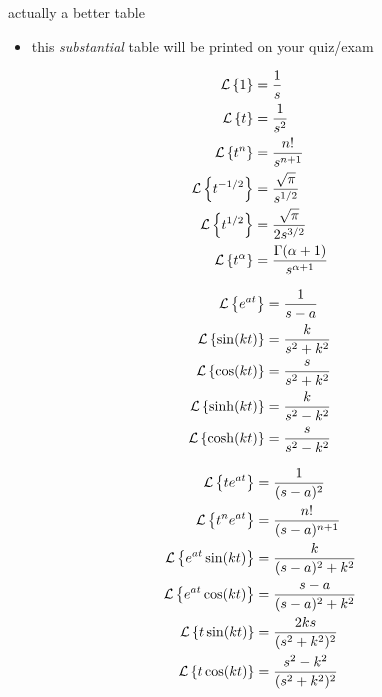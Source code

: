 \documentclass[urlcolor=blue,dvipsnames]{beamer}
\begin{document}
\begin{frame}{actually a better table}

\small
\begin{itemize}
\item this \emph{substantial} table will be printed on your quiz/exam
\end{itemize}

\vspace{-3mm}
\tiny
\begin{minipage}[t]{0.3\textwidth}
\begin{align*}
\mathcal{L}\left\{1\right\} &= \frac{1}{s} \\
\mathcal{L}\left\{t\right\} &= \frac{1}{s^2} \\
\mathcal{L}\left\{t^n\right\} &= \frac{n!}{s^{n+1}} \\
\mathcal{L}\left\{t^{-1/2}\right\} &= \frac{\sqrt{\pi}}{s^{1/2}} \\
\mathcal{L}\left\{t^{1/2}\right\} &= \frac{\sqrt{\pi}}{2s^{3/2}} \\
\mathcal{L}\left\{t^\alpha\right\} &= \frac{\Gamma(\alpha+1)}{s^{\alpha+1}}
\end{align*}
\end{minipage}
\begin{minipage}[t]{0.3\textwidth}
\begin{align*}
\mathcal{L}\left\{e^{at}\right\} &= \frac{1}{s-a} \\
\mathcal{L}\left\{\sin(kt)\right\} &= \frac{k}{s^2+k^2} \\
\mathcal{L}\left\{\cos(kt)\right\} &= \frac{s}{s^2+k^2} \\
\mathcal{L}\left\{\sinh(kt)\right\} &= \frac{k}{s^2-k^2} \\
\mathcal{L}\left\{\cosh(kt)\right\} &= \frac{s}{s^2-k^2}
\end{align*}
\end{minipage}
\begin{minipage}[t]{0.3\textwidth}
\begin{align*}
\mathcal{L}\left\{te^{at}\right\} &= \frac{1}{(s-a)^2} \\
\mathcal{L}\left\{t^n e^{at}\right\} &= \frac{n!}{(s-a)^{n+1}} \\
\mathcal{L}\left\{e^{at}\sin(kt)\right\} &= \frac{k}{(s-a)^2+k^2} \\
\mathcal{L}\left\{e^{at}\cos(kt)\right\} &= \frac{s-a}{(s-a)^2+k^2} \\
\mathcal{L}\left\{t\sin(kt)\right\} &= \frac{2ks}{(s^2+k^2)^2} \\
\mathcal{L}\left\{t\cos(kt)\right\} &= \frac{s^2-k^2}{(s^2+k^2)^2}
\end{align*}
\end{minipage}


\end{frame}
\end{document}
